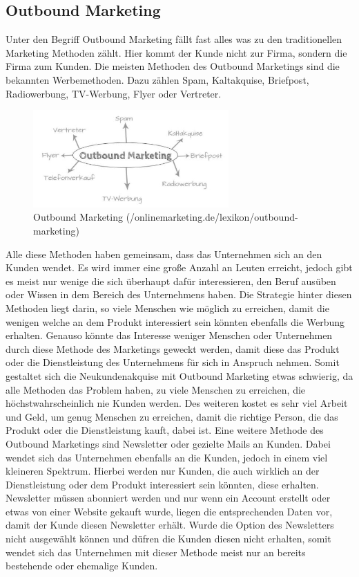 \subsection{Outbound Marketing}
Unter den Begriff Outbound Marketing fällt fast alles was zu den traditionellen Marketing Methoden zählt. Hier kommt der Kunde nicht zur Firma, sondern die Firma zum Kunden. 
\newline 
Die meisten Methoden des Outbound Marketings sind die bekannten Werbemethoden. Dazu zählen Spam, Kaltakquise, Briefpost, Radiowerbung, TV-Werbung, Flyer oder Vertreter. 
\begin{figure} [H]
	\centering
	\begin{minipage}[b]{.45\linewidth}
		\includegraphics[width=7.5cm]{./Grafiken2/Outbound_Marketing.JPG}
		\caption{Outbound Marketing (/onlinemarketing.de/lexikon/outbound-marketing)}
		\label{Create_Zubereitung}
	\end{minipage}
\end{figure}
Alle diese Methoden haben gemeinsam, dass das Unternehmen sich an den Kunden wendet. Es wird immer eine große Anzahl an Leuten erreicht, jedoch gibt es meist nur wenige die sich überhaupt dafür interessieren, den Beruf ausüben oder Wissen in dem Bereich des Unternehmens haben. Die Strategie hinter diesen Methoden liegt darin, so viele Menschen wie möglich zu erreichen, damit die wenigen welche an dem Produkt interessiert sein könnten ebenfalls die Werbung erhalten. Genauso könnte das Interesse weniger Menschen oder Unternehmen durch diese Methode des Marketings geweckt werden, damit diese das Produkt oder die Dienstleistung des Unternehmens für sich in Anspruch nehmen. 
\newline
Somit gestaltet sich die Neukundenakquise mit Outbound Marketing etwas schwierig, da alle Methoden das Problem haben, zu viele Menschen zu erreichen, die höchstwahrscheinlich nie Kunden werden. Des weiteren kostet es sehr viel Arbeit und Geld, um genug Menschen zu erreichen, damit die richtige Person, die das Produkt oder die Dienstleistung kauft, dabei ist.
\newline 
Eine weitere Methode des Outbound Marketings sind Newsletter oder gezielte Mails an Kunden. Dabei wendet sich das Unternehmen ebenfalls an die Kunden, jedoch in einem viel kleineren Spektrum. Hierbei werden nur Kunden, die auch wirklich an der Dienstleistung oder dem Produkt interessiert sein könnten, diese erhalten. Newsletter müssen abonniert werden und nur wenn ein Account erstellt oder etwas von einer Website gekauft wurde, liegen die entsprechenden Daten vor, damit der Kunde diesen Newsletter erhält. Wurde die Option des Newsletters nicht ausgewählt können und düfren die Kunden diesen nicht erhalten, somit wendet sich das Unternehmen mit dieser Methode meist nur an bereits bestehende oder ehemalige Kunden. 


